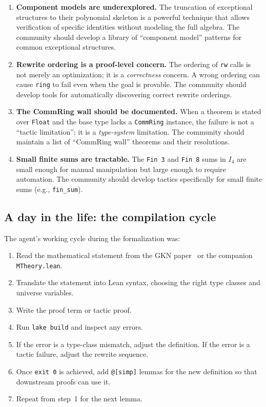 \documentclass[11pt]{article}
\theoremstyle{definition}
\newcommand{\Iq}{I_4}
\begin{document}
\begin{enumerate}[leftmargin=2em]
\item \textbf{Component models are underexplored.} The truncation of
exceptional structures to their polynomial skeleton is a powerful
technique that allows verification of specific identities without
modeling the full algebra. The community should develop a library of
``component model'' patterns for common exceptional structures.

\item \textbf{Rewrite ordering is a proof-level concern.} The ordering
of \texttt{rw} calls is not merely an optimization; it is a
\emph{correctness} concern. A wrong ordering can cause \texttt{ring} to
fail even when the goal is provable. The community should develop tools
for automatically discovering correct rewrite orderings.

\item \textbf{The CommRing wall should be documented.} When a theorem is
stated over \texttt{Float} and the base type lacks a \texttt{CommRing}
instance, the failure is not a ``tactic limitation''; it is a
\emph{type-system} limitation. The community should maintain a list of
``CommRing wall'' theorems and their resolutions.

\item \textbf{Small finite sums are tractable.} The \texttt{Fin 3} and
\texttt{Fin 8} sums in $\Iq$ are small enough for manual manipulation
but large enough to require automation. The community should develop
tactics specifically for small finite sums (e.g., \texttt{fin\_sum}).
\end{enumerate}

\subsection{A day in the life: the compilation cycle}
\label{sec:agent-cycle}

The agent's working cycle during the formalization was:

\begin{enumerate}[leftmargin=2em]
\item Read the mathematical statement from the GKN paper~\cite{gkn2001}
or the companion \texttt{MTheory.lean}.
\item Translate the statement into Lean syntax, choosing the right type
classes and universe variables.
\item Write the proof term or tactic proof.
\item Run \texttt{lake build} and inspect any errors.
\item If the error is a type-class mismatch, adjust the definition. If
the error is a tactic failure, adjust the rewrite sequence.
\item Once \texttt{exit 0} is achieved, add \texttt{@[simp]} lemmas for
the new definition so that downstream proofs can use it.
\item Repeat from step~1 for the next lemma.
\end{enumerate}
\end{document}
